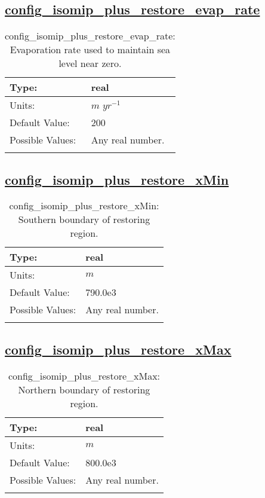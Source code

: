 \subsection[config\_isomip\_plus\_restore\_evap\_rate]{\hyperref[sec:nm_tab_isomip_plus]{config\_isomip\_plus\_restore\_evap\_rate}}
\label{subsec:nm_sec_config_isomip_plus_restore_evap_rate}
\begin{center}
\begin{longtable}{| p{2.0in} || p{4.0in} |}
    \hline
    Type: & real \\
    \hline
    Units: & $m$ $yr^{-1}$ \\
    \hline
    Default Value: & 200 \\
    \hline
    Possible Values: & Any real number. \\
    \hline
    \caption{config\_isomip\_plus\_restore\_evap\_rate: Evaporation rate used to maintain sea level near zero.}
\end{longtable}
\end{center}
\subsection[config\_isomip\_plus\_restore\_xMin]{\hyperref[sec:nm_tab_isomip_plus]{config\_isomip\_plus\_restore\_xMin}}
\label{subsec:nm_sec_config_isomip_plus_restore_xMin}
\begin{center}
\begin{longtable}{| p{2.0in} || p{4.0in} |}
    \hline
    Type: & real \\
    \hline
    Units: & $m$ \\
    \hline
    Default Value: & 790.0e3 \\
    \hline
    Possible Values: & Any real number. \\
    \hline
    \caption{config\_isomip\_plus\_restore\_xMin: Southern boundary of restoring region.}
\end{longtable}
\end{center}
\subsection[config\_isomip\_plus\_restore\_xMax]{\hyperref[sec:nm_tab_isomip_plus]{config\_isomip\_plus\_restore\_xMax}}
\label{subsec:nm_sec_config_isomip_plus_restore_xMax}
\begin{center}
\begin{longtable}{| p{2.0in} || p{4.0in} |}
    \hline
    Type: & real \\
    \hline
    Units: & $m$ \\
    \hline
    Default Value: & 800.0e3 \\
    \hline
    Possible Values: & Any real number. \\
    \hline
    \caption{config\_isomip\_plus\_restore\_xMax: Northern boundary of restoring region.}
\end{longtable}
\end{center}
